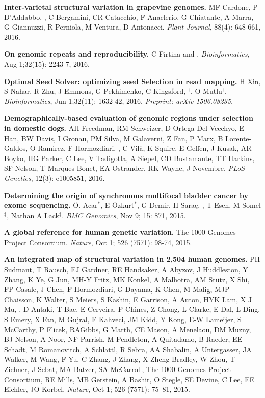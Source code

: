 \vspace{-.2cm}        
    {\bf Inter-varietal structural variation in grapevine genomes.}
    MF Cardone, P D'Addabbo, \calkan{}, C Bergamini, CR Catacchio, F Anaclerio, G Chiatante, A Marra, G Giannuzzi, R Perniola, M Ventura, D Antonacci.
    {\em Plant Journal}, 88(4): 648-661, 2016.
    
\vspace{-.2cm}        
    {\bf On genomic repeats and reproducibility.}
    C Firtina and \calkan{}.
    {\em Bioinformatics}, Aug 1;32(15): 2243-7, 2016.

\vspace{-.2cm}        
    {\bf Optimal Seed Solver: optimizing seed Selection in read mapping.}
    H Xin, S Nahar, R Zhu, J Emmons, G Pekhimenko, C Kingsford, \calkan{}$^\ddag$, O Mutlu$^\ddag$.
    {\em Bioinformatics}, Jun 1;32(11): 1632-42, 2016. \textit{Preprint: arXiv 1506.08235.}

\vspace{-.2cm}        
    {\bf Demographically-based evaluation of genomic regions under selection in domestic dogs.}
    AH Freedman, RM Schweizer, D Ortega-Del Vecchyo, E Han, BW Davis, I Gronau, PM Silva, M Galaverni, Z Fan, P Marx, B Lorente-Galdos, O Ramirez, F Hormozdiari, \calkan{}, C Vilà, K Squire, E Geffen, J Kusak, AR Boyko, HG Parker, C Lee, V Tadigotla, A Siepel, CD Bustamante, TT Harkins, SF Nelson, T Marques-Bonet, EA Ostrander, RK Wayne, J Novembre.
    {\em PLoS Genetics}, 12(3): e1005851, 2016.

\vspace{-.2cm}        
    {\bf Determining the origin of synchronous multifocal bladder cancer by exome sequencing.} 
    Ö. Acar$^*$, E Özkurt$^*$, G Demir, H Saraç, \calkan{}, T Esen, M Somel$^\ddag$, Nathan A Lack$^\ddag$.
    {\em BMC Genomics}, Nov 9; 15: 871, 2015.

\vspace{-.2cm}        
    {\bf A global reference for human genetic variation.} The 1000 Genomes Project Consortium.  {\em Nature}, Oct 1; 526 (7571): 98-74, 2015.

\vspace{-.2cm}        
    {\bf An integrated map of structural variation in 2,504 human genomes.}
    PH Sudmant, T Rausch, EJ Gardner,  RE Handsaker, A Abyzov, J Huddleston, Y Zhang, K Ye, G Jun, MH-Y Fritz, MK Konkel, A Malhotra, AM Stütz, X Shi, FP Casale, J Chen, F Hormozdiari, G Dayama, K Chen, M Malig, MJP Chaisson, K Walter, S Meiers, S Kashin, E Garrison, A Auton, HYK Lam, X J Mu, \calkan, D Antaki, T Bae, E Cerveira, P Chines, Z Chong, L Clarke, E Dal, L Ding, S Emery, X Fan, M Gujral, F Kahveci, JM Kidd, Y Kong, E-W Lameijer, S McCarthy, P Flicek, RAGibbs, G Marth, CE Mason, A Menelaou, DM Muzny, BJ Nelson, A Noor, NF Parrish, M Pendleton, A Quitadamo, B Raeder, EE Schadt, M Romanovitch, A Schlattl, R Sebra, AA Shabalin, A Untergasser, JA Walker, M Wang, F Yu, C Zhang, J Zhang, X Zheng-Bradley, W Zhou, T Zichner, J Sebat, MA Batzer, SA McCarroll, The 1000 Genomes Project Consortium, RE Mills, MB Gerstein, A Bashir, O Stegle, SE Devine, C Lee, EE Eichler, JO Korbel. 
    {\em Nature}, Oct 1; 526 (7571): 75–81, 2015.

